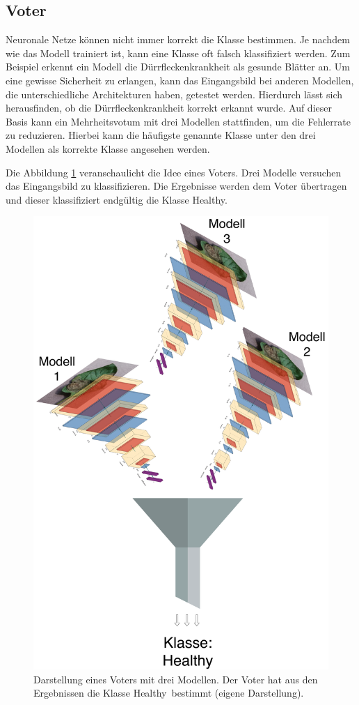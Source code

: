 \subsection{Voter}


Neuronale Netze können nicht immer korrekt die Klasse bestimmen. Je nachdem wie das Modell trainiert ist, kann eine Klasse oft falsch klassifiziert werden. Zum Beispiel erkennt ein Modell die Dürrfleckenkrankheit als gesunde Blätter an. Um eine gewisse Sicherheit zu erlangen, kann das Eingangsbild bei anderen Modellen, die unterschiedliche Architekturen haben, getestet werden. Hierdurch lässt sich herausfinden, ob die Dürrfleckenkrankheit korrekt erkannt wurde. Auf dieser Basis kann ein Mehrheitsvotum mit drei Modellen stattfinden, um die Fehlerrate zu reduzieren. Hierbei kann die häufigste genannte Klasse unter den drei Modellen als korrekte Klasse angesehen werden.


Die Abbildung \ref{voter_image_funel} veranschaulicht die Idee eines Voters. Drei Modelle versuchen das Eingangsbild zu klassifizieren. Die Ergebnisse werden dem Voter übertragen und dieser klassifiziert endgültig die Klasse \glqq Healthy\grqq.


\begin{figure}[h!]
	\centering
	\includegraphics[width=\textwidth]{bilder/voter_image_funel.pdf}
	\caption{Darstellung eines Voters mit drei Modellen. Der Voter hat aus den Ergebnissen die Klasse \glqq Healthy\grqq~bestimmt (eigene Darstellung).}
	\label{voter_image_funel}
\end{figure}


